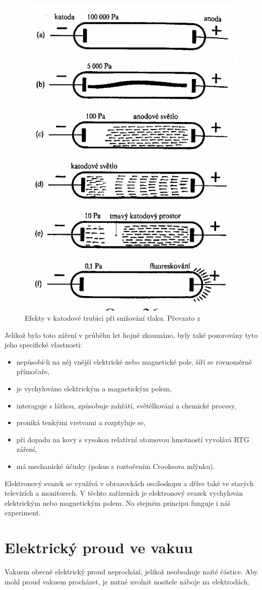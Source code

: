 \begin{figure}[htbp!]
\centering
\includegraphics[width = 170 pt]{Figure/01/katody.png}
\caption[Efekty v katodové trubici při snižování tlaku.]{Efekty v katodové trubici při snižování tlaku. Převzato z~\cite{Plyny}}
\label{01katody}
\end{figure}

Jelikož bylo toto záření v průběhu let hojně zkoumáno, byly také pozorovány tyto jeho specifické vlastnosti:
\begin{itemize}
\item nepůsobí-li na něj vnější elektrické nebo magnetické pole, šíří se rovnoměrně přímočaře,
\item je vychylováno elektrickým a magnetickým polem,
\item interaguje s látkou, způsobuje zahřátí, světélkování a chemické procesy,
\item proniká tenkými vrstvami a rozptyluje se,
\item při dopadu na kovy s vysokou relativní atomovou hmotností vyvolává RTG záření,
\item má mechanické účinky (pokus s roztočením Crooksova mlýnku).
\end{itemize}

Elektronový svazek se využívá v obrazovkách osciloskopu a dříve také ve starých televizích a monitorech. V těchto zařízeních je elektronový svazek vychylován elektrickým nebo magnetickým polem. Na stejném principu funguje i náš experiment.

\section{Elektrický proud ve vakuu}
Vakuem obecně elektrický proud neprochází, jelikož neobsahuje naité částice. Aby mohl proud vakuem procházet, je nutné uvolnit nositele náboje na elektrodách.

